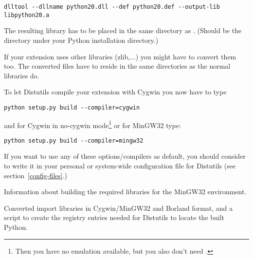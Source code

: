 \documentclass{howto}
\begin{document}
\begin{verbatim}
dlltool --dllname python20.dll --def python20.def --output-lib libpython20.a
\end{verbatim}

The resulting library has to be placed in the same directory as 
. (Should be the  directory under your
Python installation directory.)

If your extension uses other libraries (zlib,...) you might 
have to convert them too.
The converted files have to reside in the same directories as the normal
libraries do.

To let Distutils compile your extension with Cygwin you now have to type

\begin{verbatim}
python setup.py build --compiler=cygwin
\end{verbatim}

and for Cygwin in no-cygwin mode\footnote{Then you have no
\POSIX{} emulation available, but you also don't need
.} or for MinGW32 type:
 
\begin{verbatim}
python setup.py build --compiler=mingw32
\end{verbatim}

If you want to use any of these options/compilers as default, you should
consider to write it in your personal or system-wide configuration file
for Distutils (see section~\ref{config-files}.)

\begin{seealso}
    {Information about building the required libraries for the MinGW32
     environment.}

    {Converted import libraries in Cygwin/MinGW32 and Borland format,
     and a script to create the registry entries needed for Distutils
     to locate the built Python.}
\end{seealso}
\end{document}
